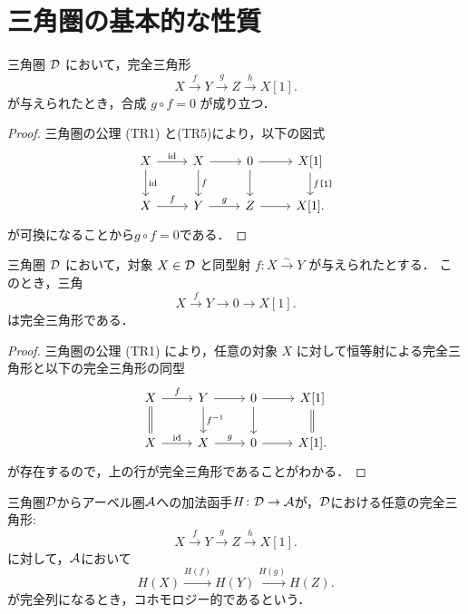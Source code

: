 \section{三角圏の基本的な性質}
\begin{prop}\cite[p.245]{KS06}\label{gf=0}
三角圏 ${\mathcal D}$ において，完全三角形
\[
X \xrightarrow{f} Y \xrightarrow{g} Z \xrightarrow{h} X[1].
\]
が与えられたとき，合成 $g \circ f = 0$ が成り立つ．
\end{prop}

\begin{proof}
三角圏の公理 (TR1) と(TR5)により，以下の図式
		\[
\begin{tikzcd}
	X\ar[r,"\id"]\ar[d,"\id"]&X \ar[r]\ar[d,"f"]& 0\ar[r]\ar[d]& X[1]\ar[d,"f\texttt{[1]}"]\\
	X\ar[r,"f"]&Y \ar[r,"g"]& Z\ar[r]& X[1].
\end{tikzcd}
	\]
	が可換になることから$g\circ f = 0$である．
\end{proof}

\begin{prop}\cite[p.245]{KS06}
三角圏 ${\mathcal D}$ において，対象 $X \in {\mathcal D}$ と同型射 $f \colon X \xrightarrow{\sim} Y$ が与えられたとする．
このとき，三角
\[
X \xrightarrow{f} Y \to 0 \to X[1].
\]
は完全三角形である．
\end{prop}

\begin{proof}
三角圏の公理 \textnormal{(TR1)} により，任意の対象 $X$ に対して恒等射による完全三角形と以下の完全三角形の同型
		\[
\begin{tikzcd}
	X\ar[r,"f"]\ar[d,equal]&Y \ar[r]\ar[d,"f\inv"]& 0\ar[r]\ar[d]& X[1]\ar[d,equal]\\
	X\ar[r,"\id"]&X \ar[r,"g"]& 0\ar[r]& X[1].
\end{tikzcd}
	\]
	が存在するので，上の行が完全三角形であることがわかる．
\end{proof}

\begin{defn}\cite[p.245]{KS06}
	三角圏${\mathcal D}$からアーベル圏${\mathcal A}$への加法函手$H\colon {\mathcal D}\to{\mathcal A}$が，${\mathcal D}$における任意の完全三角形:
	\[X\xrightarrow{f}Y\xrightarrow{g}Z\xrightarrow{h}X[1].\]
	に対して，${\mathcal A}$において
	\[H(X)\xrightarrow{H(f)}H(Y)\xrightarrow{H(g)}H(Z).\]
	が完全列になるとき，コホモロジー的であるという．
\end{defn}

